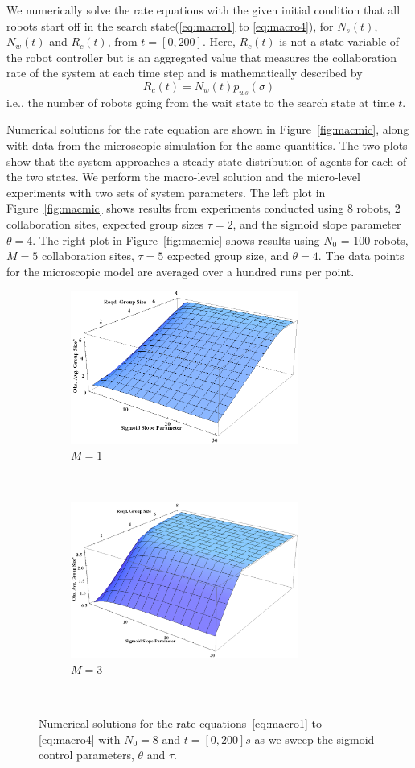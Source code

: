 \documentclass[Main.tex]{subfiles}
\begin{document}
We numerically solve the rate equations with the given initial condition that all robots start off in the search state(\eqref{eq:macro1} to \eqref{eq:macro4}), for $N_s(t)$, $N_w(t)$ and $R_c(t)$, from $t = [0, 200]$. Here, $R_c(t)$ is not a state variable of the robot controller but is an aggregated value that measures the collaboration rate of the system at each time step and is mathematically described by
\begin{equation}
R_c(t) = N_w(t)p_{ws}(\sigma)
\end{equation}
i.e., the number of robots going from the wait state to the search state at time $t$.

Numerical solutions for the rate equation are shown in Figure~\ref{fig:macmic}, along with data from the microscopic simulation for the same quantities. The two plots show that the system approaches a steady state distribution of agents for each of the two states. We perform the macro-level solution and the micro-level experiments with two sets of system parameters. The left plot in Figure~\ref{fig:macmic} shows results from experiments conducted using 8 robots, 2 collaboration sites, expected group sizes $\tau = 2$, and the sigmoid slope parameter $\theta = 4$. The right plot in Figure~\ref{fig:macmic} shows results using $N_0$ = 100 robots, $M = 5$ collaboration sites, $\tau = 5$ expected group size, and $\theta = 4$. The data points for the microscopic model are averaged over a hundred runs per point.


\begin{figure}[!ht]
\centering\begin{subfigure}{7.5cm}
\centering\includegraphics[width=7.5cm]{assets/macroSweepM1.png}
\caption{$M = 1$}\label{}
\end{subfigure}~
\centering\begin{subfigure}{7.5cm}
\centering\includegraphics[width=7.5cm]{assets/macroSweepM3.png}
\caption{$M = 3$}\label{}
\end{subfigure}~
\caption{Numerical solutions for the rate equations~\eqref{eq:macro1} to \eqref{eq:macro4} with $N_0 = 8$ and $t = [0, 200]s$ as we sweep the sigmoid control parameters, $\theta$ and $\tau$.}\label{fig:sweeps}
\end{figure}
\end{document}
